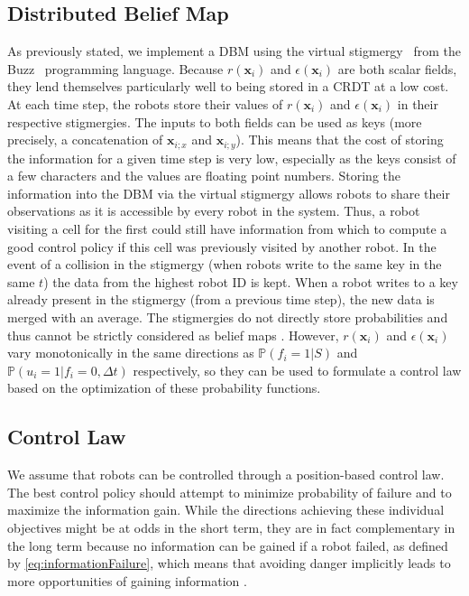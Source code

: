 \documentclass[letterpaper, 10 pt, conference]{ieeeconf}
\begin{document}
\subsection{Distributed Belief Map}
As previously stated, we implement a DBM using the virtual
stigmergy~\cite{pinciroliTuple2016} from the
Buzz~\cite{pinciroliBuzz2016} programming language. Because
$r(\bm{x}_i)$ and $\epsilon(\bm{x}_i)$ are both scalar fields, they
lend themselves particularly well to being stored in a CRDT at a low
cost. At each time step, the robots store their values of
$r(\bm{x}_i)$ and $\epsilon(\bm{x}_i)$ in their respective
stigmergies.  The inputs to both fields can be used as keys (more
precisely, a concatenation of $\bm{x}_{i;x}$ and $\bm{x}_{i;y}$). This
means that the cost of storing the information for a given time step
is very low, especially as the keys consist of a few characters and
the values are floating point numbers. Storing the information into
the DBM via the virtual stigmergy allows robots to share their
observations as it is accessible by every robot in the system. Thus, a
robot visiting a cell for the first could still have information from
which to compute a good control policy if this cell was previously
visited by another robot. In the event of a collision in the stigmergy
(when robots write to the same key in the same $t$) the data from the
highest robot ID is kept. When a robot writes to a key already present
in the stigmergy (from a previous time step), the new data is merged
with an average. The stigmergies do not directly store probabilities
and thus cannot be strictly considered as belief maps
\cite{kobayashiSharingExploringInformation2002}.  However,
$r(\bm{x}_i)$ and $\epsilon(\bm{x}_i)$ vary monotonically in the same
directions as $\mathbb{P}(f_i = 1 | S)$ and
$\mathbb{P}(u_i=1 | f_i=0, \Delta t)$ respectively, so they can be
used to formulate a control law based on the optimization of these
probability functions.


\subsection{Control Law}
We assume that robots can be controlled through a position-based
control law. The best control policy should attempt to minimize
probability of failure and to maximize the information gain. While the
directions achieving these individual objectives might be at odds in
the short term, they are in fact complementary in the long term
because no information can be gained if a robot failed, as defined by
\eqref{eq:informationFailure}, which means that avoiding danger
implicitly leads to more opportunities of gaining information
\cite{schwagerMultirobotControlPolicy2017}.
\end{document}
